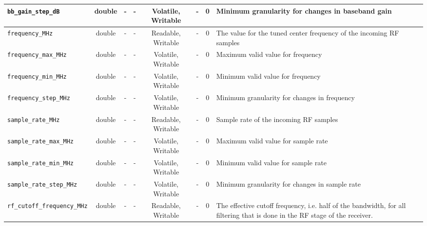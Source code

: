 \begin{landscape}
\begin{scriptsize}
\begin{tabular}{|p{4cm}|c|c|c|c|c|c|p{8cm}|}
			\hline
			\verb+bb_gain_step_dB+              & double & -        & -          & Volatile, Writable & -           & 0       & Minimum granularity for changes in baseband gain                                           \\
			\hline
			\verb+frequency_MHz+                & double & -        & -          & Readable, Writable  & -           & 0       & The value for the tuned center frequency of the incoming RF samples                        \\
			\hline
			\verb+frequency_max_MHz+            & double & -        & -          & Volatile, Writable & -           & 0       & Maximum valid value for frequency                                                          \\
			\hline
			\verb+frequency_min_MHz+            & double & -        & -          & Volatile, Writable & -           & 0       & Minimum valid value for frequency                                                          \\
			\hline
			\verb+frequency_step_MHz+           & double & -        & -          & Volatile, Writable & -           & 0       & Minimum granularity for changes in frequency                                               \\
			\hline
			\verb+sample_rate_MHz+              & double & -        & -          & Readable, Writable  & -           & 0       & Sample rate of the incoming RF samples                                                     \\
			\hline
			\verb+sample_rate_max_MHz+          & double & -        & -          & Volatile, Writable & -           & 0       & Maximum valid value for sample rate                                                        \\
			\hline
			\verb+sample_rate_min_MHz+          & double & -        & -          & Volatile, Writable & -           & 0       & Minimum valid value for sample rate                                                        \\
			\hline
			\verb+sample_rate_step_MHz+         & double & -        & -          & Volatile, Writable & -           & 0       & Minimum granularity for changes in sample rate                                             \\
			\hline
			\verb+rf_cutoff_frequency_MHz+      & double & -        & -          & Readable, Writable  & -           & 0       & The effective cutoff frequency, i.e. half of the bandwidth, for all filtering that is done in the RF stage of the receiver.      \\

\end{tabular}
\end{scriptsize}
\end{landscape}
